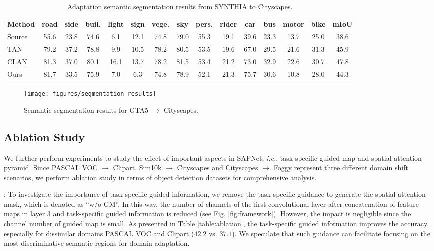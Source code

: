 \documentclass[runningheads]{llncs}
\def\ie{{\em i.e.}}
\begin{document}
\begin{table*}[t]
\centering
\caption{Adaptation semantic segmentation results from SYNTHIA to Cityscapes.}
\setlength{\tabcolsep}{1.5pt}
\begin{tabular}{l|ccccccccccccc|c}
\hline
Method & road &side &buil. &light &sign &vege. &sky &pers. &rider &car &bus &motor &bike &mIoU\\
\hline
Source &55.6 &23.8 &74.6 &6.1 &12.1 &74.8 &79.0 &55.3 &19.1 &39.6 &23.3 &13.7 &25.0 &38.6 \\
TAN \cite{DBLP:conf/cvpr/TsaiHSS0C18} &79.2 &37.2 &78.8 &9.9 &10.5 &78.2 &80.5 &53.5 &19.6 &67.0 &29.5 &21.6 &31.3 &45.9 \\
CLAN \cite{DBLP:conf/cvpr/Luo0GYY19} &81.3 &37.0 &80.1 &16.1 &13.7 &78.2 &81.5 &53.4 &21.2 &73.0 &32.9 &22.6 &30.7 &47.8 \\
Ours &81.7 &33.5 &75.9 &7.0 &6.3 &74.8 &78.9 &52.1 &21.3 &75.7 &30.6 &10.8 &28.0 &44.3 \\
\hline
\end{tabular}
\label{table:synthia2cityscapes}
\end{table*}

\begin{figure}[t]
\centering
\texttt{[image: figures/segmentation\_results]}
\caption{Semantic segmentation results for GTA5 $\to$ Cityscapes.}
\label{fig:semantic}
\end{figure}

\subsection{Ablation Study}
We further perform experiments to study the effect of important aspects in SAPNet, \ie, task-specific guided map and spatial attention pyramid. Since PASCAL VOC $\to$ Clipart, Sim10k $\to$ Cityscapes and Cityscapes $\to$ Foggy represent three different domain shift scenarios, we perform ablation study in terms of object detection datasets for comprehensive analysis.

{:} To investigate the importance of task-specific guided information, we remove the task-specific guidance to generate the spatial attention mask, which is denoted as ``w/o GM''. In this way, the number of channels of the first convolutional layer after concatenation of feature maps in layer 3 and task-specific guided information is reduced (see Fig. \ref{fig:framework}). However, the impact is negligible since the channel number of guided map is small. As presented in Table \ref{table:ablation}, the task-specific guided information improves the accuracy, especially for dissimilar domains PASCAL VOC and Clipart ($42.2$ vs. $37.1$). We speculate that such guidance can facilitate focusing on the most discriminative semantic regions for domain adaptation.
\end{document}

